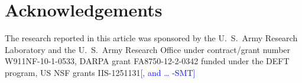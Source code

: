 \documentclass[11pt]{article}
\newcommand{\sam}[1]{\textcolor{blue}{[#1 -SMT]}}
\begin{document}
\section*{Acknowledgements}
The research reported in this article was sponsored by the U.~S.~Army Research
Laboratory and the U.~S.~Army Research Office under contract/grant number
W911NF-10-1-0533, DARPA grant FA8750-12-2-0342 funded under the DEFT program, US
NSF grants IIS-1251131\sam{, and \ldots}




\end{document}
